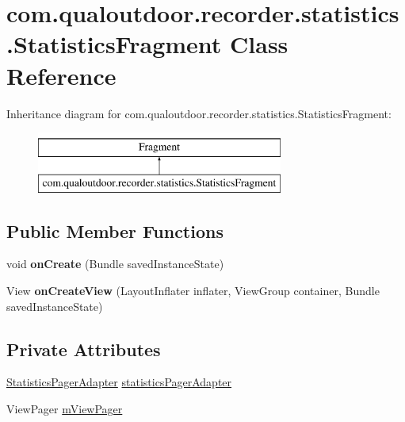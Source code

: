 \hypertarget{classcom_1_1qualoutdoor_1_1recorder_1_1statistics_1_1StatisticsFragment}{\section{com.\-qualoutdoor.\-recorder.\-statistics.\-Statistics\-Fragment Class Reference}
\label{classcom_1_1qualoutdoor_1_1recorder_1_1statistics_1_1StatisticsFragment}
}
Inheritance diagram for com.\-qualoutdoor.\-recorder.\-statistics.\-Statistics\-Fragment\-:\begin{figure}[H]
\begin{center}
\leavevmode
\includegraphics[height=2.000000cm]{classcom_1_1qualoutdoor_1_1recorder_1_1statistics_1_1StatisticsFragment}
\end{center}
\end{figure}
\subsection*{Public Member Functions}
\begin{DoxyCompactItemize}
\item 
\hypertarget{classcom_1_1qualoutdoor_1_1recorder_1_1statistics_1_1StatisticsFragment_ae6e4e41b7d0dc95f59d15c2a0a276f57}{void {\bfseries on\-Create} (Bundle saved\-Instance\-State)}\label{classcom_1_1qualoutdoor_1_1recorder_1_1statistics_1_1StatisticsFragment_ae6e4e41b7d0dc95f59d15c2a0a276f57}

\item 
\hypertarget{classcom_1_1qualoutdoor_1_1recorder_1_1statistics_1_1StatisticsFragment_ac5359d8e9d4bc64beddda84b3bb2aef6}{View {\bfseries on\-Create\-View} (Layout\-Inflater inflater, View\-Group container, Bundle saved\-Instance\-State)}\label{classcom_1_1qualoutdoor_1_1recorder_1_1statistics_1_1StatisticsFragment_ac5359d8e9d4bc64beddda84b3bb2aef6}

\end{DoxyCompactItemize}
\subsection*{Private Attributes}
\begin{DoxyCompactItemize}
\item 
\hyperlink{classcom_1_1qualoutdoor_1_1recorder_1_1statistics_1_1StatisticsPagerAdapter}{Statistics\-Pager\-Adapter} \hyperlink{classcom_1_1qualoutdoor_1_1recorder_1_1statistics_1_1StatisticsFragment_ab412cc69f46b3a557a8a87e08a1639f6}{statistics\-Pager\-Adapter}
\item 
View\-Pager \hyperlink{classcom_1_1qualoutdoor_1_1recorder_1_1statistics_1_1StatisticsFragment_afd41587fab90a4894b03e036dd002525}{m\-View\-Pager}
\end{DoxyCompactItemize}


